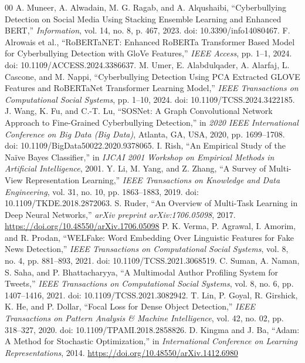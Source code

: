 \begin{thebibliography}{00}
 A. Muneer, A. Alwadain, M. G. Ragab, and A. Alqushaibi, ``Cyberbullying Detection on Social Media Using Stacking Ensemble Learning and Enhanced BERT,'' \textit{Information}, vol. 14, no. 8, p. 467, 2023. doi: 10.3390/info14080467.
 F. Alrowais et al., ``RoBERTaNET: Enhanced RoBERTa Transformer Based Model for Cyberbullying Detection with GloVe Features,'' \textit{IEEE Access}, pp. 1--1, 2024. doi: 10.1109/ACCESS.2024.3386637.
 M. Umer, E. Alabdulqader, A. Alarfaj, L. Cascone, and M. Nappi, ``Cyberbullying Detection Using PCA Extracted GLOVE Features and RoBERTaNet Transformer Learning Model,'' \textit{IEEE Transactions on Computational Social Systems}, pp. 1--10, 2024. doi: 10.1109/TCSS.2024.3422185.
 J. Wang, K. Fu, and C.-T. Lu, ``SOSNet: A Graph Convolutional Network Approach to Fine-Grained Cyberbullying Detection,'' in \textit{2020 IEEE International Conference on Big Data (Big Data)}, Atlanta, GA, USA, 2020, pp. 1699--1708. doi: 10.1109/BigData50022.2020.9378065.
 I. Rish, ``An Empirical Study of the Na\"{i}ve Bayes Classifier,'' in \textit{IJCAI 2001 Workshop on Empirical Methods in Artificial Intelligence}, 2001.
 Y. Li, M. Yang, and Z. Zhang, ``A Survey of Multi-View Representation Learning,'' \textit{IEEE Transactions on Knowledge and Data Engineering}, vol. 31, no. 10, pp. 1863--1883, 2019. doi: 10.1109/TKDE.2018.2872063.
 S. Ruder, ``An Overview of Multi-Task Learning in Deep Neural Networks,'' \textit{arXiv preprint arXiv:1706.05098}, 2017. \url{https://doi.org/10.48550/arXiv.1706.05098}
 P. K. Verma, P. Agrawal, I. Amorim, and R. Prodan, ``WELFake: Word Embedding Over Linguistic Features for Fake News Detection,'' \textit{IEEE Transactions on Computational Social Systems}, vol. 8, no. 4, pp. 881--893, 2021. doi: 10.1109/TCSS.2021.3068519.
 C. Suman, A. Naman, S. Saha, and P. Bhattacharyya, ``A Multimodal Author Profiling System for Tweets,'' \textit{IEEE Transactions on Computational Social Systems}, vol. 8, no. 6, pp. 1407--1416, 2021. doi: 10.1109/TCSS.2021.3082942.
 T. Lin, P. Goyal, R. Girshick, K. He, and P. Dollar, ``Focal Loss for Dense Object Detection,'' \textit{IEEE Transactions on Pattern Analysis \& Machine Intelligence}, vol. 42, no. 02, pp. 318--327, 2020. doi: 10.1109/TPAMI.2018.2858826.
 D. Kingma and J. Ba, ``Adam: A Method for Stochastic Optimization,'' in \textit{International Conference on Learning Representations}, 2014. \url{https://doi.org/10.48550/arXiv.1412.6980}

\end{thebibliography}
